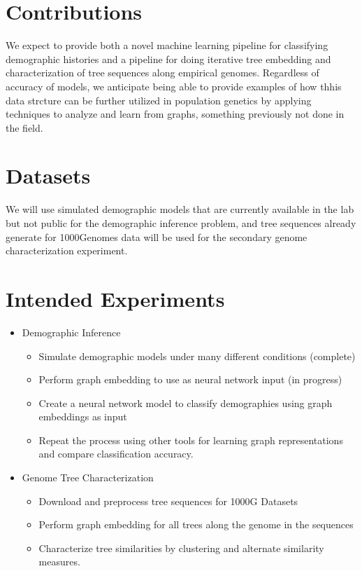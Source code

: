 \documentclass{article}
\begin{document}
\section{Contributions}
We expect to provide both a novel machine learning pipeline for classifying demographic histories and a pipeline for doing iterative tree embedding and characterization of tree sequences along empirical genomes. Regardless of accuracy of models, we anticipate being able to provide examples of how thhis data strcture can be further utilized in population genetics by applying techniques to analyze and learn from graphs, something previously not done in the field.

\section{Datasets}

We will use simulated demographic models that are currently available in the lab but not public for the demographic inference problem, and tree sequences already generate for 1000Genomes data will be used for the secondary genome characterization experiment.

\section{Intended Experiments}
\begin{itemize}
    \item Demographic Inference
    \begin{itemize}
        \item Simulate demographic models under many different conditions (complete)
        \item Perform graph embedding to use as neural network input (in progress)
        \item Create a neural network model to classify demographies using graph embeddings as input
        \item Repeat the process using other tools for learning graph representations and compare classification accuracy.
    \end{itemize}
    \item Genome Tree Characterization
    \begin{itemize}
        \item Download and preprocess tree sequences for 1000G Datasets
        \item Perform graph embedding for all trees along the genome in the sequences
        \item Characterize tree similarities by clustering and alternate similarity measures.
    \end{itemize}
\end{itemize}
\end{document}
